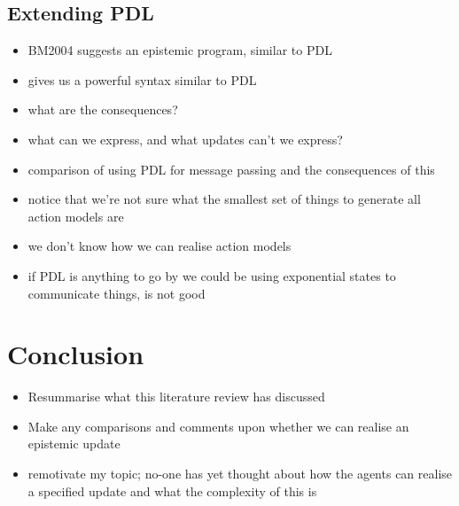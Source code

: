 \documentclass[10pt, a4paper, twoside]{article}
\begin{document}
\subsection{Extending PDL}\label{actModelExtends}
\begin{itemize}
  \item BM2004 suggests an epistemic program, similar to PDL
  \item gives us a powerful syntax similar to PDL
  \item what are the consequences?
  \item what can we express, and what updates can't we express?
  \item comparison of using PDL for message passing and the consequences of this
  \item notice that we're not sure what the smallest set of things to generate
  all action models are
  \item we don't know how we can realise action models
  \item if PDL is anything to go by we could be using exponential states to
  communicate things, is not good
\end{itemize}

\section{Conclusion}\label{conclusion}
\begin{itemize}
  \item Resummarise what this literature review has discussed
  \item Make any comparisons and comments upon whether we can realise an
  epistemic update
  \item remotivate my topic; no-one has yet thought about how the agents can
  realise a specified update and what the complexity of this is
\end{itemize}
\end{document}
